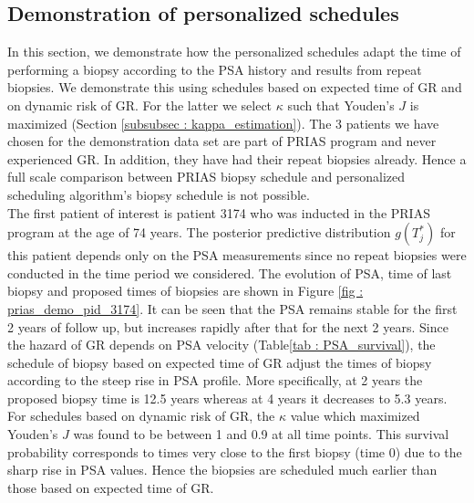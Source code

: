 \subsection{Demonstration of personalized schedules}
\label{subsec : demo_prias_pers_schedule}
In this section, we demonstrate how the personalized schedules adapt the time of performing a biopsy according to the PSA history and results from repeat biopsies. We demonstrate this using schedules based on expected time of GR and on dynamic risk of GR. For the latter we select $\kappa$ such that Youden's $J$ is maximized (Section \ref{subsubsec : kappa_estimation}). The 3 patients we have chosen for the demonstration data set are part of PRIAS program and never experienced GR. In addition, they have had their repeat biopsies already. Hence a full scale comparison between PRIAS biopsy schedule and personalized scheduling algorithm's biopsy schedule is not possible.\\

The first patient of interest is patient 3174 who was inducted in the PRIAS program at the age of 74 years. The posterior predictive distribution $g(T^*_j)$ for this patient depends only on the PSA measurements since no repeat biopsies were conducted in the time period we considered. The evolution of PSA, time of last biopsy and proposed times of biopsies are shown in Figure \ref{fig : prias_demo_pid_3174}. It can be seen that the PSA remains stable for the first 2 years of follow up, but increases rapidly after that for the next 2 years. Since the hazard of GR depends on PSA velocity (Table\ref{tab : PSA_survival}), the schedule of biopsy based on expected time of GR adjust the times of biopsy according to the steep rise in PSA profile. More specifically, at 2 years the proposed biopsy time is 12.5 years whereas at 4 years it decreases to 5.3 years. For schedules based on dynamic risk of GR, the $\kappa$ value which maximized Youden's $J$ was found to be between 1 and 0.9 at all time points. This survival probability corresponds to times very close to the first biopsy (time 0) due to the sharp rise in PSA values. Hence the biopsies are scheduled much earlier than those based on expected time of GR.\\

